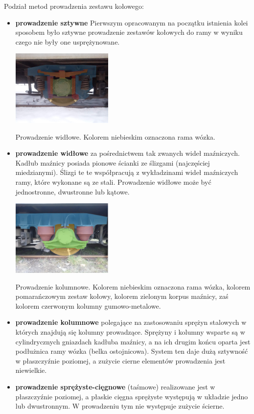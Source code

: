 Podział metod prowadzenia zestawu kołowego:
\begin{itemize}
\item \textbf{prowadzenie sztywne} 
Pierwszym opracowanym na początku istnienia kolei sposobem było sztywne prowadzenie zestawów kołowych do ramy w wyniku czego nie były one usprężynowane.
\begin{marginfigure}
	\includegraphics[width=5cm]{skryptkierownik-img/prowadzenie-zestawu-widlowe.jpg}
	\caption{Prowadzenie widłowe. Kolorem niebieskim oznaczona rama wózka.}
\end{marginfigure}
\item \textbf{prowadzenie widłowe} za pośrednictwem tak zwanych wideł maźniczych. Kadłub maźnicy posiada pionowe ścianki ze ślizgami (najczęściej miedzianymi). Ślizgi te te współpracują z wykładzinami wideł maźniczych ramy, które wykonane są ze stali. Prowadzenie widłowe może być jednostronne, dwustronne lub kątowe. 
\begin{marginfigure}
	\includegraphics[width=5cm]{skryptkierownik-img/prowadzenie-zestawu-kolumnowe.jpg}
	\caption{Prowadzenie kolumnowe. Kolorem niebieskim oznaczona rama wózka, kolorem pomarańczowym zestaw kołowy, kolorem zielonym korpus maźnicy, zaś kolorem czerwonym kolumny gumowo-metalowe.}
\end{marginfigure} 
\item \textbf{prowadzenie kolumnowe} polegające na zastosowaniu sprężyn stalowych w których znajdują się kolumny prowadzące. Sprężyny i kolumny wsparte są w cylindrycznych gniazdach kadłuba maźnicy, a na ich drugim końcu oparta jest podłużnica ramy wózka (belka ostojnicowa). System ten daje dużą sztywność w płaszczyźnie poziomej, a zużycie cierne elementów prowadzenia jest niewielkie. 
\item \textbf{prowadzenie sprężyste-cięgnowe} (taśmowe) realizowane jest w płaszczyźnie poziomej, a płaskie cięgna sprężyste występują w układzie jedno lub dwustronnym. W prowadzeniu tym nie występuje zużycie ścierne. 

\end{itemize}
